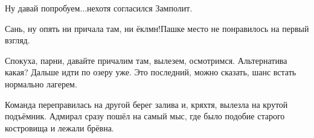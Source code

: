 \diagdash Ну давай попробуем$\ldots$\mdash нехотя согласился Замполит.

\diagdash Сань, ну опять ни причала там, ни ёклмн!\mdash Пашке место не понравилось на первый взгляд.

\diagdash Спокуха, парни, давайте причалим там, вылезем, осмотримся. Альтернатива какая? Дальше идти по озеру уже. Это последний, можно сказать, шанс встать нормально лагерем.

Команда переправилась на другой берег залива и, кряхтя, вылезла на крутой подъёмник. Адмирал сразу пошёл на самый мыс, где было подобие старого костровища и лежали брёвна.








\begin{center}
\end{center}
